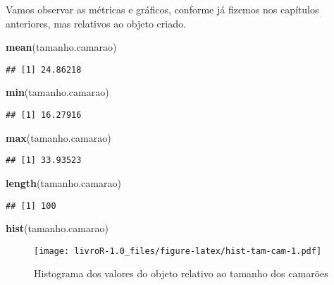 \documentclass[titlepage, oneside, openany, a4paper]{book}
\newenvironment{Shaded}{\begin{snugshade}}{\end{snugshade}}
\newcommand{\KeywordTok}[1]{\textcolor[rgb]{0.13,0.29,0.53}{\textbf{#1}}}
\newcommand{\NormalTok}[1]{#1}
\begin{document}
Vamos observar as métricas e gráficos, conforme já fizemos nos capítulos anteriores, mas relativos ao objeto criado.

\begin{Shaded}
\begin{Highlighting}[]
\KeywordTok{mean}\NormalTok{(tamanho.camarao)}
\end{Highlighting}
\end{Shaded}

\begin{verbatim}
## [1] 24.86218
\end{verbatim}

\begin{Shaded}
\begin{Highlighting}[]
\KeywordTok{min}\NormalTok{(tamanho.camarao)}
\end{Highlighting}
\end{Shaded}

\begin{verbatim}
## [1] 16.27916
\end{verbatim}

\begin{Shaded}
\begin{Highlighting}[]
\KeywordTok{max}\NormalTok{(tamanho.camarao)}
\end{Highlighting}
\end{Shaded}

\begin{verbatim}
## [1] 33.93523
\end{verbatim}

\begin{Shaded}
\begin{Highlighting}[]
\KeywordTok{length}\NormalTok{(tamanho.camarao)}
\end{Highlighting}
\end{Shaded}

\begin{verbatim}
## [1] 100
\end{verbatim}

\begin{Shaded}
\begin{Highlighting}[]
\KeywordTok{hist}\NormalTok{(tamanho.camarao)}
\end{Highlighting}
\end{Shaded}

\begin{figure}
\centering
\texttt{[image: livroR-1.0\_files/figure-latex/hist-tam-cam-1.pdf]}
\caption{\label{fig:hist-tam-cam}Histograma dos valores do objeto relativo ao tamanho dos camarões}
\end{figure}
\end{document}
